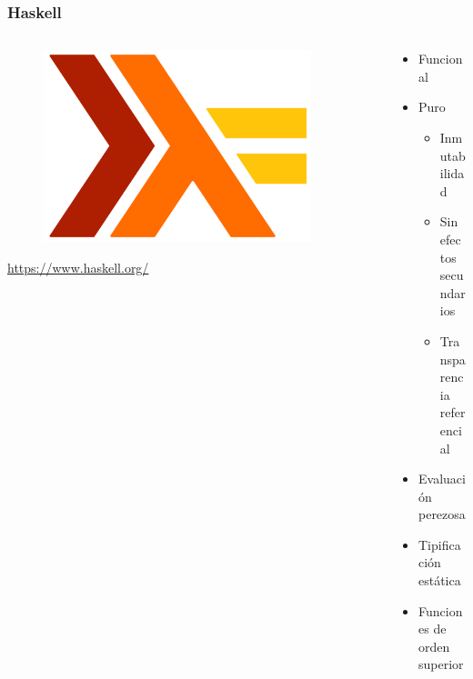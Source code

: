 \documentclass{beamer}
\begin{document}
\begin{frame}[fragile]
  \frametitle{Haskell}


  \begin{columns}[T]
    \begin{column}{.54\textwidth}
      \begin{block}

         \begin{figure}
           \includegraphics[width=0.9\textwidth]{img/haskell.png}
         \end{figure}

         \begin{center}
           \url{https://www.haskell.org/}
         \end{center}

      \end{block}
    \end{column}

    \begin{column}{.55\textwidth}

      \begin{block}{}

        \begin{itemize}
	  \item Funcional
          \item Puro
	    \begin{itemize}
              \item Inmutabilidad
              \item Sin efectos secundarios
              \item Transparencia referencial
    \end{itemize} 
	 \item Evaluación perezosa
	  \item Tipificación estática
	  \item Funciones de orden superior
        \end{itemize} 

      \end{block}
    \end{column}
  \end{columns}

\end{frame}
\end{document}
